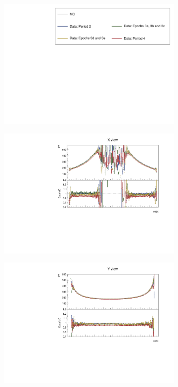\documentclass[12pt,a4paper]{article}
\begin{document}
\begin{figure}[h!]
  \begin{subfigure}{\textwidth}
  \centering
    \includegraphics[height=0.2\linewidth]{essentialsec_tb/legend.pdf}
  \end{subfigure}
  \vspace*{2mm}

  \begin{subfigure}{0.5\textwidth}
    \includegraphics[width=\linewidth]{PlotsAngularDistribution/pe_cosx_x.pdf}
  \end{subfigure}
  \begin{subfigure}{0.5\textwidth}
    \includegraphics[width=\linewidth]{PlotsAngularDistribution/pe_cosx_y.pdf}

\end{subfigure}
\end{figure}
\end{document}
